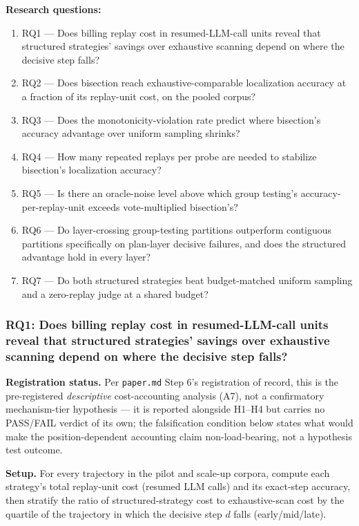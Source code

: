 \documentclass[11pt]{article}
\begin{document}
\textbf{Research questions:}
\begin{enumerate}[leftmargin=1.6em]
\item RQ1 --- Does billing replay cost in resumed-LLM-call units reveal that structured strategies' savings over exhaustive scanning depend on where the decisive step falls?
\item RQ2 --- Does bisection reach exhaustive-comparable localization accuracy at a fraction of its replay-unit cost, on the pooled corpus?
\item RQ3 --- Does the monotonicity-violation rate predict where bisection's accuracy advantage over uniform sampling shrinks?
\item RQ4 --- How many repeated replays per probe are needed to stabilize bisection's localization accuracy?
\item RQ5 --- Is there an oracle-noise level above which group testing's accuracy-per-replay-unit exceeds vote-multiplied bisection's?
\item RQ6 --- Do layer-crossing group-testing partitions outperform contiguous partitions specifically on plan-layer decisive failures, and does the structured advantage hold in every layer?
\item RQ7 --- Do both structured strategies beat budget-matched uniform sampling and a zero-replay judge at a shared budget?
\end{enumerate}

\subsubsection{RQ1: Does billing replay cost in resumed-LLM-call units reveal that structured strategies' savings over exhaustive scanning depend on where the decisive step falls?}
\textbf{Registration status.} Per \texttt{paper.md} Step 6's registration of record, this is the pre-registered \emph{descriptive} cost-accounting analysis (A7), not a confirmatory mechanism-tier hypothesis --- it is reported alongside H1--H4 but carries no PASS/FAIL verdict of its own; the falsification condition below states what would make the position-dependent accounting claim non-load-bearing, not a hypothesis test outcome.

\textbf{Setup.} For every trajectory in the pilot and scale-up corpora, compute each strategy's total replay-unit cost (resumed LLM calls) and its exact-step accuracy, then stratify the ratio of structured-strategy cost to exhaustive-scan cost by the quartile of the trajectory in which the decisive step $d$ falls (early/mid/late).
\end{document}
